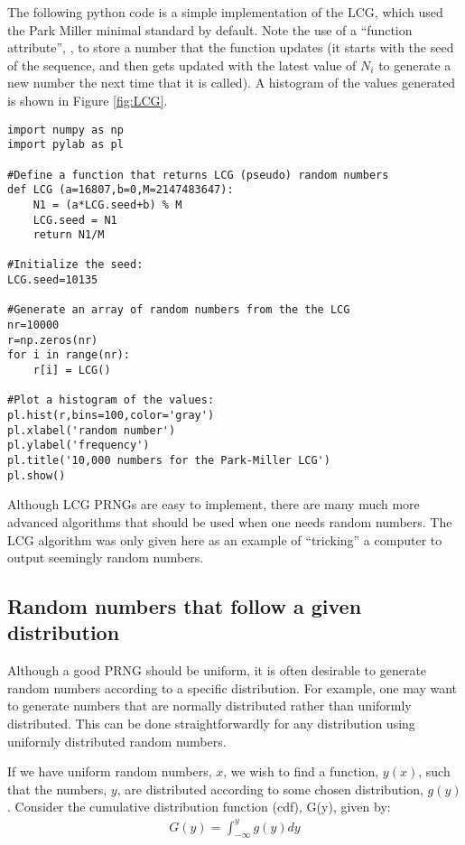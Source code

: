 The following python code is a simple implementation of the LCG, which used the Park Miller minimal standard by default. Note the use of a ``function attribute'', , to store a number that the  function updates (it starts with the seed of the sequence, and then gets updated with the latest value of $N_i$ to generate a new number the next time that it is called). A histogram of the values generated is shown in Figure \ref{fig:LCG}.
\begin{lstlisting}[frame=single] 
import numpy as np
import pylab as pl

#Define a function that returns LCG (pseudo) random numbers
def LCG (a=16807,b=0,M=2147483647):
    N1 = (a*LCG.seed+b) % M
    LCG.seed = N1
    return N1/M

#Initialize the seed:
LCG.seed=10135

#Generate an array of random numbers from the the LCG
nr=10000
r=np.zeros(nr)
for i in range(nr):
    r[i] = LCG()

#Plot a histogram of the values:
pl.hist(r,bins=100,color='gray')
pl.xlabel('random number')
pl.ylabel('frequency')
pl.title('10,000 numbers for the Park-Miller LCG')
pl.show()
\end{lstlisting}


Although LCG PRNGs are easy to implement, there are many much more advanced algorithms that should be used when one needs random numbers. The LCG algorithm was only given here as an example of ``tricking'' a computer to output seemingly random numbers.

\subsection{Random numbers that follow a given distribution}
Although a good PRNG should be uniform, it is often desirable to generate random numbers according to a specific distribution. For example, one may want to generate numbers that are normally distributed rather than uniformly distributed. This can be done straightforwardly for any distribution using uniformly distributed random numbers.

If we have uniform random numbers, $x$, we wish to find a function, $y(x)$, such that the numbers, $y$, are distributed according to some chosen distribution, $g(y)$. Consider the cumulative distribution function (cdf), G(y), given by:
\begin{align*}
G(y) = \int_{-\infty}^y g(y)dy
\end{align*}

